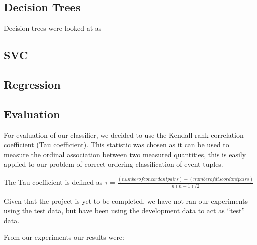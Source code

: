 \documentclass[12pt]{report}
\begin{document}
\subsection{Decision Trees}
Decision trees were looked at as %
\subsection{SVC}
\subsection{Regression}
\subsection{Evaluation}
For evaluation of our classifier, we decided to use the Kendall rank correlation coefficient (Tau coefficient).
This statistic was chosen as it can be used to measure the ordinal association between two measured quantities,
this is easily applied to our problem of correct ordering classification of event tuples. 

The Tau coefficient is defined as $\tau = \frac{(number of concordant pairs) - (number of discordant pairs)}{n(n-1)/2}$\cite{}%


Given that the project is yet to be completed, we have not ran our experiments using the test data, but have been using
the development data to act as ``test'' data.

From our experiments our results were:



\end{document}
